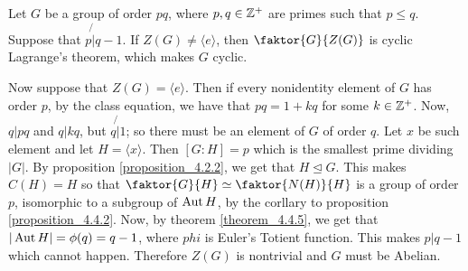 \begin{example}\label{example_4.11}
  Let $G$ be a group of order $pq$, where $p,q \in \mathbb{Z}^+$ are primes such that
  $p \leq q$. Suppose that  $p \not{|} q-1$. If $Z(G) \neq \langle e
  \rangle$, then $\faktor{G}{Z(G)}$ is cyclic Lagrange's theorem, which makes
  $G$ cyclic.

  Now suppose that $Z(G)=\langle e \rangle$. Then if every nonidentity
  element of $G$ has order  $p$, by the class equation, we have that
  $pq=1+kq$ for some  $k \in \mathbb{Z}^+$. Now,  $q|pq$ and  $q|kq$, but  $q \not{|}
  1$; so there must be an element of $G$ of order $q$. Let $x$ be such
  element and let  $H=\langle x \rangle$. Then $[G:H]=p$ which is the
  smallest prime dividing $|G|$. By proposition \ref{proposition_4.2.2}, we get that $H
  \unlhd G$. This makes  $C(H)=H$ so that $\faktor{G}{H} \simeq
  \faktor{N(H)}{H}$ is a group of order $p$, isomorphic to a subgroup of
  $\operatorname{Aut}{H}$, by the corllary to proposition \ref{proposition_4.4.2}. Now, by theorem
  \ref{theorem_4.4.5}, we get that $|\operatorname{Aut}{H}|=\phi(q)=q-1$, where $phi$ is
  Euler's Totient function. This makes $p|q-1$ which cannot happen. Therefore
  $Z(G)$ is nontrivial and $G$ must be Abelian.
\end{example}


